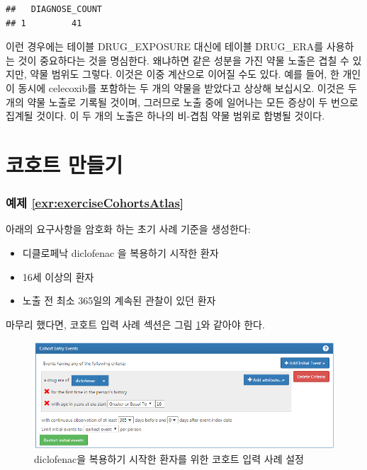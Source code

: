\documentclass[11pt]{book}
\providecommand{\tightlist}{%
  \setlength{\itemsep}{0pt}\setlength{\parskip}{0pt}}
\theoremstyle{definition}
\theoremstyle{definition}
\theoremstyle{definition}
\theoremstyle{remark}
\begin{document}
\begin{verbatim}
##   DIAGNOSE_COUNT
## 1         41
\end{verbatim}

이런 경우에는 테이블 DRUG\_EXPOSURE 대신에 테이블 DRUG\_ERA를 사용하는
것이 중요하다는 것을 명심한다. 왜냐하면 같은 성분을 가진 약물 노출은
겹칠 수 있지만, 약물 범위도 그렇다. 이것은 이중 계산으로 이어질 수도
있다. 예를 들어, 한 개인이 동시에 celecoxib를 포함하는 두 개의 약물을
받았다고 상상해 보십시오. 이것은 두 개의 약물 노출로 기록될 것이며,
그러므로 노출 중에 일어나는 모든 증상이 두 번으로 집계될 것이다. 이 두
개의 노출은 하나의 비-겹침 약물 범위로 합병될 것이다.

\section{코호트 만들기}\label{Cohortsanswers}

\subsubsection*{예제
\ref{exr:exerciseCohortsAtlas}}\label{-refexrexercisecohortsatlas}

아래의 요구사항을 암호화 하는 초기 사례 기준을 생성한다:

\begin{itemize}
\tightlist
\item
  디클로페낙 diclofenac 을 복용하기 시작한 환자
\item
  16세 이상의 환자
\item
  노출 전 최소 365일의 계속된 관찰이 있던 환자
\end{itemize}

마무리 했다면, 코호트 입력 사례 섹션은 그림
\ref{fig:cohortsAtlasInitialEvents}와 같아야 한다.

\begin{figure}

{\centering \includegraphics[width=1\linewidth]{images/SuggestedAnswers/cohortsAtlasInitialEvents} 

}

\caption{diclofenac을 복용하기 시작한 환자를 위한 코호트 입력 사례 설정}\label{fig:cohortsAtlasInitialEvents}
\end{figure}
\end{document}
